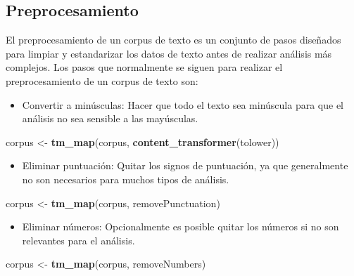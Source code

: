 \documentclass[
]{article}
\newenvironment{Shaded}{\begin{snugshade}}{\end{snugshade}}
\newcommand{\FunctionTok}[1]{\textcolor[rgb]{0.13,0.29,0.53}{\textbf{#1}}}
\newcommand{\NormalTok}[1]{#1}
\newcommand{\OtherTok}[1]{\textcolor[rgb]{0.56,0.35,0.01}{#1}}
\providecommand{\tightlist}{%
  \setlength{\itemsep}{0pt}\setlength{\parskip}{0pt}}
\begin{document}
\hypertarget{preprocesamiento}{%
\subsection{Preprocesamiento}\label{preprocesamiento}}

El preprocesamiento de un corpus de texto es un conjunto de pasos
diseñados para limpiar y estandarizar los datos de texto antes de
realizar análisis más complejos. Los pasos que normalmente se siguen
para realizar el preprocesamiento de un corpus de texto son:

\begin{itemize}
\tightlist
\item
  Convertir a minúsculas: Hacer que todo el texto sea minúscula para que
  el análisis no sea sensible a las mayúsculas.
\end{itemize}

\begin{Shaded}
\begin{Highlighting}[]
\NormalTok{corpus }\OtherTok{\textless{}{-}} \FunctionTok{tm\_map}\NormalTok{(corpus, }\FunctionTok{content\_transformer}\NormalTok{(tolower))}
\end{Highlighting}
\end{Shaded}

\begin{itemize}
\tightlist
\item
  Eliminar puntuación: Quitar los signos de puntuación, ya que
  generalmente no son necesarios para muchos tipos de análisis.
\end{itemize}

\begin{Shaded}
\begin{Highlighting}[]
\NormalTok{corpus }\OtherTok{\textless{}{-}} \FunctionTok{tm\_map}\NormalTok{(corpus, removePunctuation)}
\end{Highlighting}
\end{Shaded}

\begin{itemize}
\tightlist
\item
  Eliminar números: Opcionalmente es posible quitar los números si no
  son relevantes para el análisis.
\end{itemize}

\begin{Shaded}
\begin{Highlighting}[]
\NormalTok{corpus }\OtherTok{\textless{}{-}} \FunctionTok{tm\_map}\NormalTok{(corpus, removeNumbers)}
\end{Highlighting}
\end{Shaded}
\end{document}
